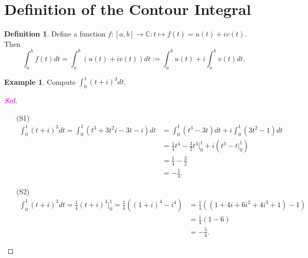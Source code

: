 \documentclass[12pt,openany]{book}
\theoremstyle{definition}
\newtheorem{definition}{Definition}[chapter]
\newtheorem{example}{Example}[section]
\newcommand{\R}{\mathbb{R}}
\newcommand{\C}{\mathbb{C}}
\newcommand{\of}[1]{\left( #1 \right)}
\newcommand{\sol}{\textcolor{magenta}{\bf Sol}}
\begin{document}
	\section{Definition of the Contour Integral}
	\begin{tcolorbox}[colback=white,colframe=defcolor,arc=5pt,title={\color{white}\bf Path Integral $\R\to\C$}]
		\begin{definition}
			Define a function $f:[a,b]\to\C:t\mapsto f\of{t}=u\of{t}+iv\of{t}$. Then \[
			\int_a^bf\of{t}dt=\int_a^b\of{u\of{t}+iv\of{t}}dt:=\int_a^bu(t)+i\int_a^bv\of{t}dt.
			\]
		\end{definition}
	\end{tcolorbox}
	\begin{example}
		Compute $\int_0^1\of{t+i}^3dt$.
		\begin{proof}[\sol]
			\begin{itemize}
				\item[(S1)] \begin{align*}
					\int_0^1\of{t+i}^3dt=\int_0^1\of{t^3+3t^2i-3t-i}dt&=\int_0^1\of{t^3-3t}dt+i\int_0^1\of{3t^2-1}dt\\
					&=\frac{1}{4}t^4-\frac{3}{2}t^3\bigg|_0^1+i\left(t^3-t\bigg|_0^1\right)\\
					&=\frac{1}{4}-\frac{3}{2}\\
					&=-\frac{5}{4}.
				\end{align*}
				\item[(S2)] \begin{align*}
					\int_0^1\of{t+i}^3dt=\frac{1}{4}\of{t+i}^4\bigg|_0^1=\frac{1}{4}\of{(1+i)^4-i^4}&=\frac{1}{4}\of{\of{1+4i+6i^2+4i^3+1}-1}\\
					&=\frac{1}{4}\of{1-6}\\
					&=-\frac{5}{4}.
				\end{align*}
			\end{itemize}
		\end{proof}
	\end{example}
	
\end{document}
